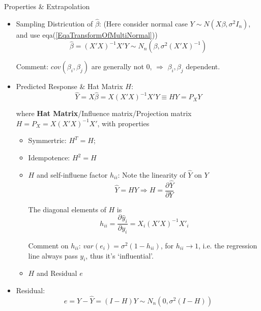     Properties \& Extrapolation
\begin{itemize}[topsep=2pt,itemsep=2pt]
    \item Sampling Districution of $ \hat{\beta } $: (Here consider normal case $ Y\sim N(X\beta ,\sigma^2I_n) $, and use eqa(\ref{EqaTransformOfMultiNormal})) 
    \begin{equation}
        \hat{\beta }=(X'X)^{-1}X'Y \sim N_n(\beta,\sigma^2(X'X)^{-1})
    \end{equation}

    Comment: $ cov(\beta_i,\beta_j ) $ are generally not 0, $ \Rightarrow $ $ \beta _i,\beta _j $ dependent.
    \item Predicted Response \& Hat Matrix $ H $:
    \begin{equation}
        \hat{Y}=X\hat{\beta }=X(X'X)^{-1}X'Y\equiv  HY=P_XY
    \end{equation}

    where \textbf{Hat Matrix}/Influence matrix/Projection matrix $ H=P_X=X(X'X)^{-1}X' $, with properties
    \begin{itemize}[topsep=2pt,itemsep=2pt]
        \item Symmertric: $ H^T=H $;
        \item Idempotence: $ H^2=H $
        \item $ H $ and self-influene factor $ h_{ii} $: Note the linearity of $ \hat{Y} $ on $ Y $
        \begin{equation}
            \hat{Y}=HY \Rightarrow H=\dfrac{\partial^{} \hat{Y}}{\partial Y^{}}
        \end{equation} 
    
        The diagonal elements of $ H $ is 
        \begin{equation}
            h_{ii}=\dfrac{\partial^{}\hat{y}_i}{\partial y_i^{}}=X_i(X'X)^{-1}X'_i
        \end{equation}

        Comment on $ h_{ii} $: $ var(e_i) =\sigma ^2(1-h_{ii})$, for $ h_{ii}\to 1 $, i.e. the regression line always pass $ y_i $, thus it's `influential'.
        \item $ H $ and Residual $ e $
    \end{itemize}




    \item Residual:
    \begin{equation}
        e=Y-\hat{Y}=(I-H)Y\sim N_n\left(0 , \sigma ^2(I-H) \right)
    \end{equation}


\end{itemize}

